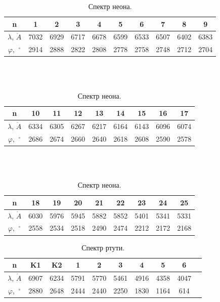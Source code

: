 \documentclass[a4paper, 12pt]{article}
\renewcommand{\phi}{\varphi}
\renewcommand{\AA}{\ensuremath{\mathring{A}}}
\begin{document}
\begin{table}[!h]
    \centering
    \begin{tabular}{|c|c|c|c|c|c|c|c|c|c|}
        \hline
        n & 1 & 2 & 3 & 4 & 5 & 6 & 7 & 8 & 9 \\ \hline
        $\lambda$, $\AA$ & 7032 & 6929 & 6717 & 6678 & 6599 & 6533 & 6507 & 6402 & 6383 \\ \hline
        $\phi$, $~^\circ$ & 2914 & 2888 & 2822 & 2808 & 2778 & 2758 & 2748 & 2712 & 2704 \\ \hline
    \end{tabular}
    \\~\\
    \begin{tabular}{|c|c|c|c|c|c|c|c|c|}
        \hline
        n & 10 & 11 & 12 & 13 & 14 & 15 & 16 & 17 \\ \hline
        $\lambda$, $\AA$ & 6334 & 6305 & 6267 & 6217 & 6164 & 6143 & 6096 & 6074 \\ \hline
        $\phi$, $~^\circ$ & 2686 & 2674 & 2660 & 2640 & 2618 & 2608 & 2590 & 2578 \\ \hline
    \end{tabular}
    \\~\\
    \begin{tabular}{|c|c|c|c|c|c|c|c|c|}
        \hline
        n & 18 & 19 & 20 & 21 & 22 & 23 & 24 & 25 \\ \hline
        $\lambda$, $\AA$ & 6030 & 5976 & 5945 & 5882 & 5852 & 5401 & 5341 & 5331 \\ \hline
        $\phi$, $~^\circ$ & 2558 & 2534 & 2518 & 2490 & 2474 & 2212 & 2172 & 2168
        \\ \hline
    \end{tabular}
    \caption {Спектр неона.}
    \label{tab:neon}
\end{table}

\begin{table}[!h]
    \centering
    \begin{tabular}{|c|c|c|c|c|c|c|c|c|c|}
        \hline
        n & K1 & K2 & 1 & 2 & 3 & 4 & 5 & 6\\ \hline
        $\lambda$, $\AA$ & 6907 & 6234 & 5791 & 5770 & 5461 & 4916 & 4358 & 4047\\ \hline
        $\phi$, $~^\circ$ & 2880 & 2648 & 2444 & 2440 & 2250 & 1830 & 1164 & 614
        \\ \hline
    \end{tabular}
    \caption {Спектр ртути.}
    \label{tab:hydr}
\end{table}
\end{document}
